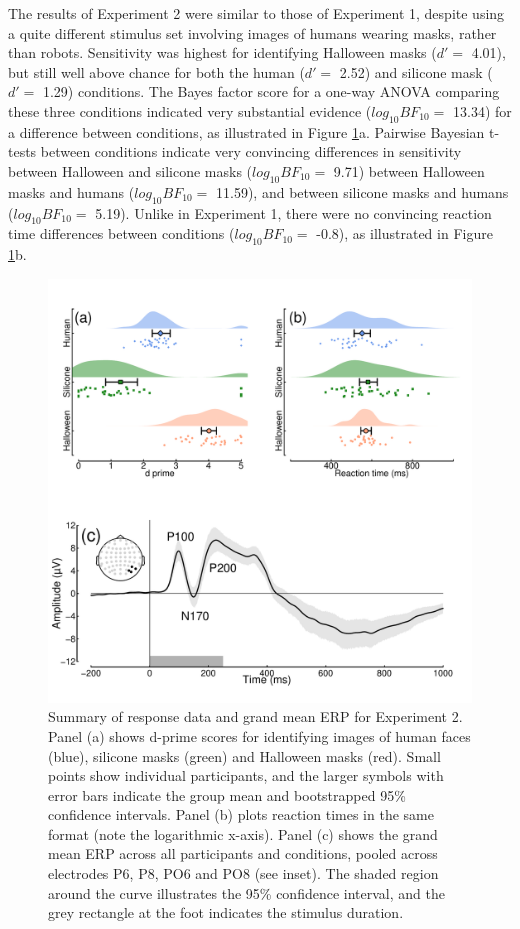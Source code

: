 \documentclass[
]{article}
\begin{document}
The results of Experiment 2 were similar to those of Experiment 1, despite using a quite different stimulus set involving images of humans wearing masks, rather than robots. Sensitivity was highest for identifying Halloween masks (\(d' =\) 4.01), but still well above chance for both the human (\(d' =\) 2.52) and silicone mask (\(d' =\) 1.29) conditions. The Bayes factor score for a one-way ANOVA comparing these three conditions indicated very substantial evidence (\(log_{10}BF_{10} =\) 13.34) for a difference between conditions, as illustrated in Figure \ref{fig:MasksData}a. Pairwise Bayesian t-tests between conditions indicate very convincing differences in sensitivity between Halloween and silicone masks (\(log_{10}BF_{10} =\) 9.71) between Halloween masks and humans (\(log_{10}BF_{10} =\) 11.59), and between silicone masks and humans (\(log_{10}BF_{10} =\) 5.19). Unlike in Experiment 1, there were no convincing reaction time differences between conditions (\(log_{10}BF_{10} =\) -0.8), as illustrated in Figure \ref{fig:MasksData}b.

\begin{figure}

{\centering \includegraphics{Figures/MasksData} 

}

\caption{Summary of response data and grand mean ERP for Experiment 2. Panel (a) shows d-prime scores for identifying images of human faces (blue), silicone masks (green) and Halloween masks (red). Small points show individual participants, and the larger symbols with error bars indicate the group mean and bootstrapped 95\% confidence intervals. Panel (b) plots reaction times in the same format (note the logarithmic x-axis). Panel (c) shows the grand mean ERP across all participants and conditions, pooled across electrodes P6, P8, PO6 and PO8 (see inset). The shaded region around the curve illustrates the 95\% confidence interval, and the grey rectangle at the foot indicates the stimulus duration.}\label{fig:MasksData}
\end{figure}
\end{document}
